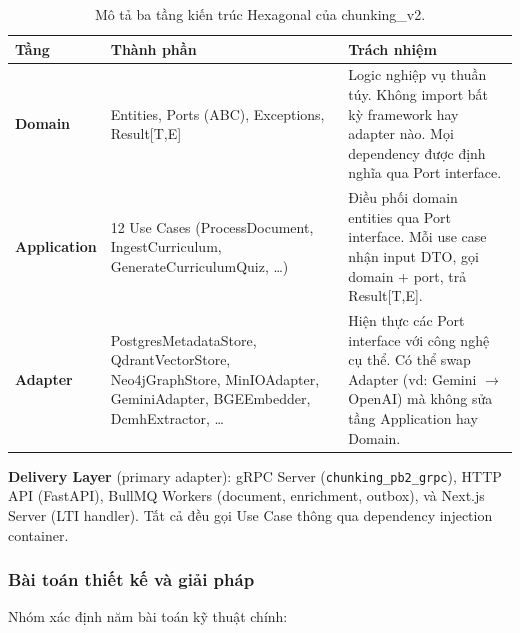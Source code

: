 \begin{table}[H]
    \centering
    \caption{Mô tả ba tầng kiến trúc Hexagonal của chunking\_v2.}
    \label{tab:arch-layers}
    \begin{tabular}{p{3cm}p{4.5cm}p{7cm}}
        \toprule
        \textbf{Tầng} & \textbf{Thành phần} & \textbf{Trách nhiệm} \\
        \midrule
        \textbf{Domain}
            & Entities, Ports (ABC), Exceptions, Result[T,E]
            & Logic nghiệp vụ thuần túy. Không import bất kỳ
              framework hay adapter nào. Mọi dependency được
              định nghĩa qua Port interface. \\
        \midrule
        \textbf{Application}
            & 12 Use Cases (ProcessDocument, IngestCurriculum,
              GenerateCurriculumQuiz, \dots)
            & Điều phối domain entities qua Port interface.
              Mỗi use case nhận input DTO, gọi domain + port,
              trả Result[T,E]. \\
        \midrule
        \textbf{Adapter}
            & PostgresMetadataStore, QdrantVectorStore,
              Neo4jGraphStore, MinIOAdapter, GeminiAdapter,
              BGEEmbedder, DcmhExtractor, \dots
            & Hiện thực các Port interface với công nghệ cụ thể.
              Có thể swap Adapter (vd: Gemini $\to$ OpenAI) mà
              không sửa tầng Application hay Domain. \\
        \bottomrule
    \end{tabular}
\end{table}

\textbf{Delivery Layer} (primary adapter): gRPC Server
(\texttt{chunking\_pb2\_grpc}), HTTP API (FastAPI), BullMQ Workers
(document, enrichment, outbox), và Next.js Server (LTI handler).
Tất cả đều gọi Use Case thông qua dependency injection container.

\subsubsection{Bài toán thiết kế và giải pháp}

Nhóm xác định năm bài toán kỹ thuật chính:

